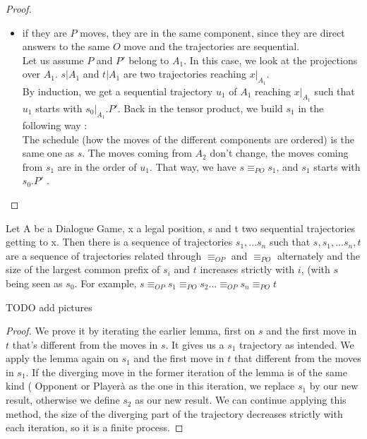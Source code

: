 \documentclass[a4paper,UKenglish]{lipics}
\begin{document}
\begin{proof}
\begin{itemize}
\begin{itemize}
\end{itemize}
\item if they are $P$ moves,  they are in the same component, since they are direct answers to the same $O$ move and the trajectories are sequential.\\ Let us assume $P$ and $P'$ belong to $A_1$. In this case, we look at the projections over $A_1$. $s|A_1$ and $t|A_1$ are two trajectories reaching $x|_{A_1}$.\\
 By induction, we get a sequential trajectory $u_1$ of $A_1$ reaching $x|_{A_1}$ such that $u_1$ starts with $s_0|_{A_1}.P'$. Back in the tensor product, we build $s_1$ in the following way :\\
 The schedule (how the moves of the different components are ordered) is the same one as $s$. The moves coming from $A_2$ don't change, the moves coming from $s_1$ are in the order of $u_1$. That way, we have $s \equiv_{PO} s_1$, and $s_1$ starts with $s_0.P'$ . \\


\end{itemize}
\end{proof}



\begin{lemma}
Let A be a Dialogue Game, x a legal position, s and t two sequential trajectories getting to x. Then there is a sequence of trajectories $s_1,...s_n$ such that $s,s_1,... s_n,t$ are a sequence of trajectories related through $\equiv_{OP}$ and $\equiv_{PO}$ alternately and the size of the largest common prefix of $s_i$ and $t$ increases strictly with $i$, (with $s$ being seen as $s_0$. For example,  $s \equiv_{OP} s_1\equiv_{PO} s_2 ... \equiv_{OP} s_n \equiv_{PO} t$
\end{lemma} 
TODO add pictures
\begin{proof}
We prove it by iterating the earlier lemma, first on $s$ and the first move in $t$ that's different from the moves in $s$. It gives us a $s_1$ trajectory as intended. We apply the lemma again on $s_1$ and the first move in $t$ that different from the moves in $s_1$. If the diverging move in the former iteration of the lemma is of the same kind ( Opponent or Playerà as the one in this iteration, we replace $s_1$ by our new result, otherwise we define $s_2$ as our new result. We can continue applying this method, the size of the diverging part of the trajectory decreases strictly with each iteration, so it is a finite process.
\end{proof}
\end{document}
